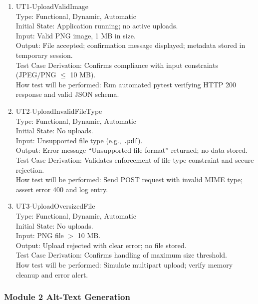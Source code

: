 \documentclass[12pt, titlepage]{article}
\begin{document}
\begin{enumerate}
\item{UT1-UploadValidImage\\}
  Type: Functional, Dynamic, Automatic\\
  Initial State: Application running; no active uploads.\\
  Input: Valid PNG image, 1 MB in size.\\
  Output: File accepted; confirmation message displayed; metadata
  stored in temporary session.\\
  Test Case Derivation: Confirms compliance with input constraints
  (JPEG/PNG $\leq$ 10 MB).\\
  How test will be performed: Run automated pytest verifying HTTP 200
  response and valid JSON schema.

\item{UT2-UploadInvalidFileType\\}
  Type: Functional, Dynamic, Automatic\\
  Initial State: No uploads.\\
  Input: Unsupported file type (e.g., \texttt{.pdf}).\\
  Output: Error message ``Unsupported file format'' returned; no data stored.\\
  Test Case Derivation: Validates enforcement of file type constraint
  and secure rejection.\\
  How test will be performed: Send POST request with invalid MIME
  type; assert error 400 and log entry.

\item{UT3-UploadOversizedFile\\}
  Type: Functional, Dynamic, Automatic\\
  Initial State: No uploads.\\
  Input: PNG file $>$ 10 MB.\\
  Output: Upload rejected with clear error; no file stored.\\
  Test Case Derivation: Confirms handling of maximum size threshold.\\
  How test will be performed: Simulate multipart upload; verify
  memory cleanup and error alert.
\end{enumerate}

\subsubsection{Module 2 \textemdash{} Alt-Text Generation}
\end{document}
